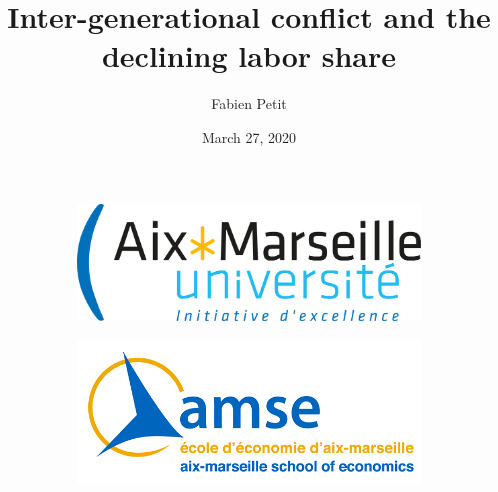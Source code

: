 \documentclass[usenames,dvipsnames]{beamer}
\begin{document}
	
	\title[Inter-generational conflict and labor share]{Inter-generational conflict and the declining labor share}
	\author[Fabien Petit]{Fabien Petit}
	\date{March 27, 2020}
	
	\begin{frame}
		\titlepage
		\vspace{-0.5cm}
		\begin{figure}
			\begin{subfigure}[h]{0.49\linewidth}
				\centering
				\includegraphics[width=0.7\linewidth]{Pictures/amu} 
			\end{subfigure}
			\begin{subfigure}[h]{0.49\linewidth}
				\centering
				\includegraphics[width=0.7\linewidth]{Pictures/amse.png}
			\end{subfigure}
		\end{figure}
	\end{frame}
\end{document}
